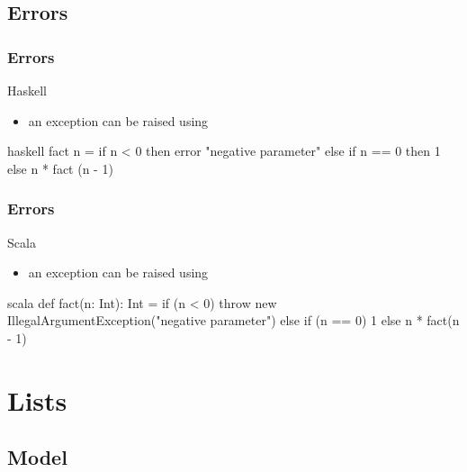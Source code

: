 \documentclass[dvipsnames]{beamer}
\theoremstyle{plain}
\begin{document}
\subsection{Errors}

\begin{frame}[fragile]
  \frametitle{Errors}

  \begin{block}{Haskell}
    \begin{itemize}
      \item an exception can be raised using 
    \end{itemize}
  \end{block}

  \begin{example}[factorial]
    \begin{pygments}{haskell}
fact n =
    if n < 0
    then error "negative parameter"
    else if n == 0
         then 1
         else n * fact (n - 1)
    \end{pygments}
  \end{example}
\end{frame}

\begin{frame}[fragile]
  \frametitle{Errors}

  \begin{block}{Scala}
    \begin{itemize}
      \item an exception can be raised using 
    \end{itemize}
  \end{block}

  \begin{example}[factorial]
    \begin{pygments}{scala}
def fact(n: Int): Int =
    if (n < 0) throw
        new IllegalArgumentException("negative parameter")
    else if (n == 0) 1
         else n * fact(n - 1)
    \end{pygments}
  \end{example}
\end{frame}

\section{Lists}

\subsection{Model}
\end{document}
